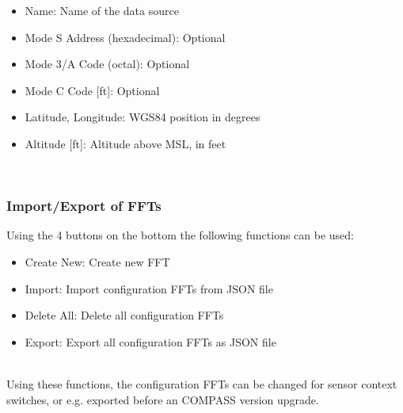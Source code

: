 \begin{itemize}
\item Name: Name of the data source
\item Mode S Address (hexadecimal): Optional
\item Mode 3/A Code (octal): Optional
\item Mode C Code [ft]: Optional
\item Latitude, Longitude: WGS84 position in degrees
\item Altitude [ft]: Altitude above MSL, in feet
\end{itemize}
\ \\

\subsubsection{Import/Export of FFTs}
\label{sec:config_fft_export}

Using the 4 buttons on the bottom the following functions can be used:

\begin{itemize}
\item Create New: Create new FFT
\item Import: Import configuration FFTs from JSON file
\item Delete All: Delete all configuration FFTs
\item Export: Export all configuration FFTs as JSON file
\end{itemize}
\ \\

Using these functions, the configuration FFTs can be changed for sensor context switches, or e.g. exported before an COMPASS version upgrade.

